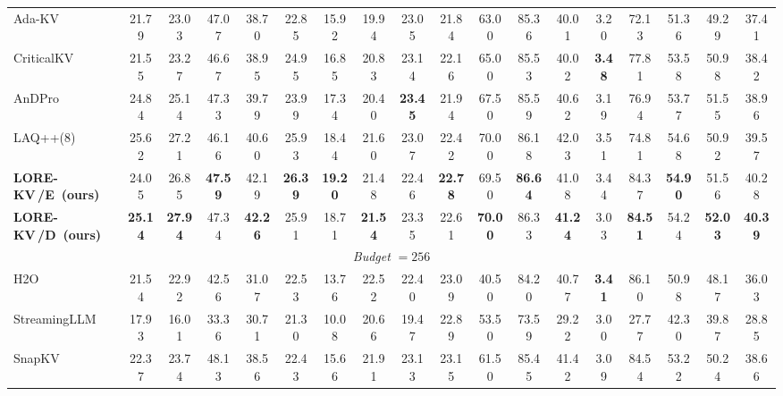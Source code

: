 \documentclass{article} %
\newcommand{\best}[1]{\textcolor{bestblue}{\textbf{#1}}}
\newcommand{\second}[1]{\textcolor{secondorange}{#1}}
\newcommand{\lorekvE}{LORE-KV\,/E}
\newcommand{\lorekvD}{LORE-KV\,/D}
\begin{document}
\begin{table}[t]
{\begin{tabular}{lccccccccccccccccc}
Ada-KV 
& 21.79 & 23.03 & 47.07 
& 38.70 & 22.85 & 15.92 
& 19.94 & 23.05 & 21.84 
& 63.00 & 85.36 & 40.01 
& 3.20 & 72.13 
& 51.36 & 49.29 
& 37.41 \\

CriticalKV 
& 21.55 & 23.27 & 46.67 
& 38.95 & 24.95 & 16.85 
& 20.83 & 23.14 & 22.16 
& 65.00 & 85.53 & 40.02 
& \best{3.48} & 77.81 
& 53.58 & 50.98 
& 38.42 \\

AnDPro 
& \second{24.84} & 25.14 & 47.33 
& 39.79 & 23.99 & 17.34 
& 20.40 & \best{23.45} & 21.94 
& 67.50 & 85.59 & 40.62 
& 3.19 & 76.94 
& 53.77 & 51.55 
& 38.96 \\

LAQ++(8) 
& 25.62 & 27.21 & 46.16 
& 40.60 & 25.93 & 18.44 
& 21.60 & 23.07 & 22.42 
& 70.00 & 86.18 & 42.03 
& 3.51 & 74.81 
& 54.68 & 50.92 
& 39.57 \\

\textbf{\lorekvE\ (ours)} 
& 24.05 & \second{26.85} & \best{47.59} 
& \second{42.19} & \best{26.39} & \best{19.20} 
& \second{21.48} & 22.46 & \best{22.78} 
& \second{69.50} & \best{86.64} & \second{41.08} 
& \second{3.44} & \second{84.37} 
& \best{54.90} & \second{51.56} 
& \second{40.28} \\

\textbf{\lorekvD\ (ours)} 
& \best{25.14} & \best{27.94} & \second{47.34} 
& \best{42.26} & \second{25.91} & \second{18.71} 
& \best{21.54} & \second{23.35} & \second{22.61} 
& \best{70.00} & \second{86.33} & \best{41.24} 
& 3.03 & \best{84.51} 
& \second{54.24} & \best{52.03} 
& \best{40.39} \\

\midrule
\multicolumn{18}{c}{\textit{Budget} $=256$} \\
\midrule

H2O 
& 21.54 & 22.92 & 42.56 
& 31.07 & 22.53 & 13.76 
& 22.52 & 22.40 & 23.09 
& 40.50 & 84.20 & 40.77 
& \best{3.41} & 86.10 
& 50.98 & 48.17 
& 36.03 \\

StreamingLLM 
& 17.93 & 16.01 & 33.36 
& 30.71 & 21.30 & 10.08 
& 20.66 & 19.47 & 22.89 
& 53.50 & 73.59 & 29.22 
& 3.00 & 27.77 
& 42.30 & 39.87 
& 28.85 \\

SnapKV 
& 22.37 & 23.74 & 48.13 
& 38.56 & 22.43 & 15.66 
& 21.91 & 23.13 & 23.15 
& 61.50 & 85.45 & 41.42 
& 3.09 & 84.54 
& 53.22 & 50.24 
& 38.66 \\


\end{tabular}}
\end{table}
\end{document}
